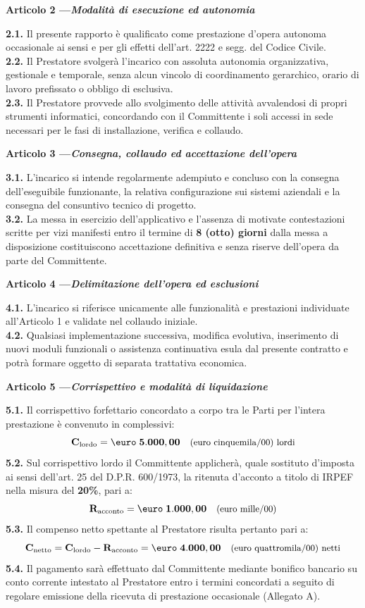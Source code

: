 \documentclass[11pt,a4paper]{article}
\newcommand{\articolo}[2]{%
  \vspace{0.8em}%
  {\noindent\bfseries Articolo #1 \quad---\quad \itshape #2}\par\vspace{0.2em}%
}
\begin{document}
\articolo{2}{Modalità di esecuzione ed autonomia}
\textbf{2.1.} Il presente rapporto è qualificato come prestazione d'opera autonoma occasionale ai sensi e per gli effetti dell'art. 2222 e segg. del Codice Civile.\\
\textbf{2.2.} Il Prestatore svolgerà l'incarico con assoluta autonomia organizzativa, gestionale e temporale, senza alcun vincolo di coordinamento gerarchico, orario di lavoro prefissato o obbligo di esclusiva.\\
\textbf{2.3.} Il Prestatore provvede allo svolgimento delle attività avvalendosi di propri strumenti informatici, concordando con il Committente i soli accessi in sede necessari per le fasi di installazione, verifica e collaudo.

\articolo{3}{Consegna, collaudo ed accettazione dell'opera}
\textbf{3.1.} L'incarico si intende regolarmente adempiuto e concluso con la consegna dell'eseguibile funzionante, la relativa configurazione sui sistemi aziendali e la consegna del consuntivo tecnico di progetto.\\
\textbf{3.2.} La messa in esercizio dell'applicativo e l'assenza di motivate contestazioni scritte per vizi manifesti entro il termine di \textbf{8 (otto) giorni} dalla messa a disposizione costituiscono accettazione definitiva e senza riserve dell'opera da parte del Committente.

\articolo{4}{Delimitazione dell'opera ed esclusioni}
\textbf{4.1.} L'incarico si riferisce unicamente alle funzionalità e prestazioni individuate all'Articolo 1 e validate nel collaudo iniziale.\\
\textbf{4.2.} Qualsiasi implementazione successiva, modifica evolutiva, inserimento di nuovi moduli funzionali o assistenza continuativa esula dal presente contratto e potrà formare oggetto di separata trattativa economica.

\newpage

\articolo{5}{Corrispettivo e modalità di liquidazione}
\textbf{5.1.} Il corrispettivo forfettario concordato a corpo tra le Parti per l'intera prestazione è convenuto in complessivi:
\[
  \mathbf{C_{\text{lordo}} = \text{\euro}\;5.000,00} \quad \text{\small (euro cinquemila/00) lordi}
\]
\textbf{5.2.} Sul corrispettivo lordo il Committente applicherà, quale sostituto d'imposta ai sensi dell'art. 25 del D.P.R. 600/1973, la ritenuta d'acconto a titolo di IRPEF nella misura del \textbf{20\%}, pari a:
\[
  \mathbf{R_{\text{acconto}} = \text{\euro}\;1.000,00} \quad \text{\small (euro mille/00)}
\]
\textbf{5.3.} Il compenso netto spettante al Prestatore risulta pertanto pari a:
\[
  \mathbf{C_{\text{netto}} = C_{\text{lordo}} - R_{\text{acconto}} = \text{\euro}\;4.000,00} \quad \text{\small (euro quattromila/00) netti}
\]
\textbf{5.4.} Il pagamento sarà effettuato dal Committente mediante bonifico bancario su conto corrente intestato al Prestatore entro i termini concordati a seguito di regolare emissione della ricevuta di prestazione occasionale (Allegato A).
\end{document}
